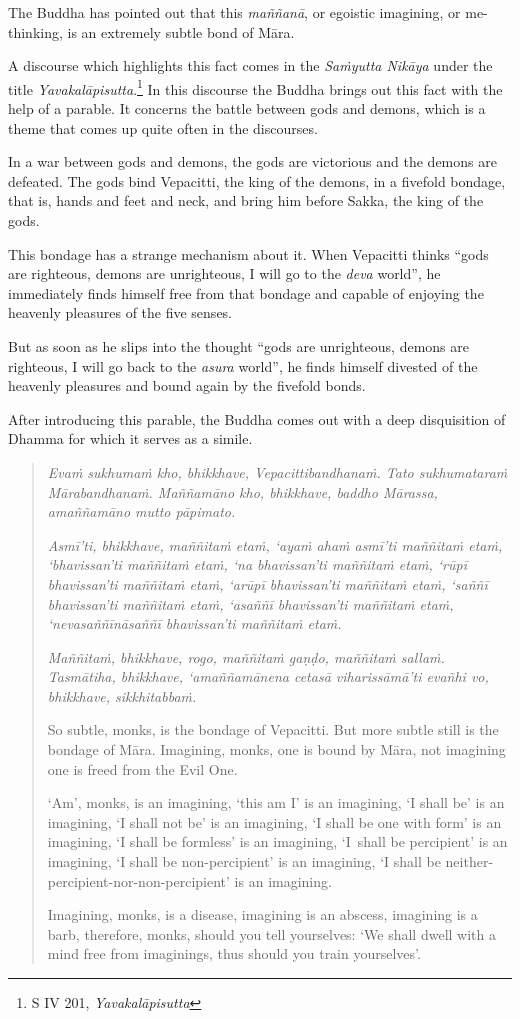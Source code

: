 The Buddha has pointed out that this \emph{maññanā}, or egoistic imagining, or me-thinking, is an extremely subtle bond of Māra.

A discourse which highlights this fact comes in the \emph{Saṁyutta Nikāya} under the title \emph{Yavakalāpisutta}.\footnote{S IV 201, \emph{Yavakalāpisutta}} In this discourse the Buddha brings out this fact with the help of a parable. It concerns the battle between gods and demons, which is a theme that comes up quite often in the discourses.

In a war between gods and demons, the gods are victorious and the demons are defeated. The gods bind Vepacitti, the king of the demons, in a fivefold bondage, that is, hands and feet and neck, and bring him before Sakka, the king of the gods.

This bondage has a strange mechanism about it. When Vepacitti thinks ``gods are righteous, demons are unrighteous, I will go to the \emph{deva} world'', he immediately finds himself free from that bondage and capable of enjoying the heavenly pleasures of the five senses.

But as soon as he slips into the thought ``gods are unrighteous, demons are righteous, I will go back to the \emph{asura} world'', he finds himself divested of the heavenly pleasures and bound again by the fivefold bonds.

After introducing this parable, the Buddha comes out with a deep disquisition of Dhamma for which it serves as a simile.

\begin{quote}
\emph{Evaṁ sukhumaṁ kho, bhikkhave, Vepacittibandhanaṁ. Tato sukhumataraṁ Mārabandhanaṁ. Maññamāno kho, bhikkhave, baddho Mārassa, amaññamāno mutto pāpimato.}

\emph{Asmī'ti, bhikkhave, maññitaṁ etaṁ, `ayaṁ ahaṁ asmī'ti maññitaṁ etaṁ, `bhavissan'ti maññitaṁ etaṁ, `na bhavissan'ti maññitaṁ etaṁ, `rūpī bhavissan'ti maññitaṁ etaṁ, `arūpī bhavissan'ti maññitaṁ etaṁ, `saññī bhavissan'ti maññitaṁ etaṁ, `asaññī bhavissan'ti maññitaṁ etaṁ, `nevasaññīnāsaññī bhavissan'ti maññitaṁ etaṁ.}

\emph{Maññitaṁ, bhikkhave, rogo, maññitaṁ gaṇḍo, maññitaṁ sallaṁ. Tasmātiha, bhikkhave, `amaññamānena cetasā viharissāmā'ti evañhi vo, bhikkhave, sikkhitabbaṁ.}

So subtle, monks, is the bondage of Vepacitti. But more subtle still is the bondage of Māra. Imagining, monks, one is bound by Māra, not imagining one is freed from the Evil One.

`Am', monks, is an imagining, `this am I' is an imagining, `I shall be' is an imagining, `I shall not be' is an imagining, `I shall be one with form' is an imagining, `I shall be formless' is an imagining, `I~shall be percipient' is an imagining, `I shall be non-percipient' is an imagining, `I shall be neither-percipient-nor-non-percipient' is an imagining.

Imagining, monks, is a disease, imagining is an abscess, imagining is a barb, therefore, monks, should you tell yourselves: `We shall dwell with a mind free from imaginings, thus should you train yourselves'.
\end{quote}

